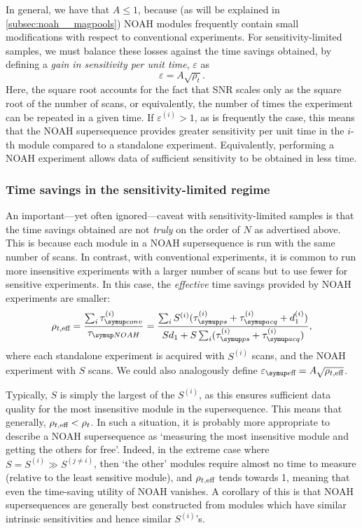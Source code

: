 In general, we have that $A \leq 1$, because (as will be explained in \cref{subsec:noah__magpools}) NOAH modules frequently contain small modifications with respect to conventional experiments.
For sensitivity-limited samples, we must balance these losses against the time savings obtained, by defining a \textit{gain in sensitivity per unit time}, $\varepsilon$ as
\begin{equation}
    \label{eq:varepsilon_i}
    \varepsilon = A \sqrt{\rho_t}.
\end{equation}
Here, the square root accounts for the fact that SNR scales only as the square root of the number of scans, or equivalently, the number of times the experiment can be repeated in a given time.
If $\varepsilon^{(i)} > 1$, as is frequently the case, this means that the NOAH supersequence provides greater sensitivity per unit time in the $i$-th module compared to a standalone experiment.
Equivalently, performing a NOAH experiment allows data of sufficient sensitivity to be obtained in less time.


\subsubsection{Time savings in the sensitivity-limited regime}

An important---yet often ignored---caveat with sensitivity-limited samples is that the time savings obtained are not \textit{truly} on the order of $N$ as advertised above.
This is because each module in a NOAH supersequence is run with the same number of scans.
In contrast, with conventional experiments, it is common to run more insensitive experiments with a larger number of scans but to use fewer for sensitive experiments.
In this case, the \textit{effective} time savings provided by NOAH experiments are smaller:
\begin{equation}
    \label{eq:rho_t_eff}
    \rhoteff
    = \frac{\sum_i \tauconv^{(i)}}{\tauNOAH}
    = \frac{{\sum_i S^{(i)}(\taups^{(i)} + \tauacq^{(i)} + d_1^{(i)})}}{Sd_1 + S\sum_i (\taups^{(i)} + \tauacq^{(i)})},
\end{equation}
where each standalone experiment is acquired with $S^{(i)}$ scans, and the NOAH experiment with $S$ scans.
We could also analogously define $\vareeff = A\sqrt{\rhoteff}$.

Typically, $S$ is simply the largest of the $S^{(i)}$, as this ensures sufficient data quality for the most insensitive module in the supersequence.
This means that generally, $\rho_{t,\text{eff}} < \rho_t$.
In such a situation, it is probably more appropriate to describe a NOAH supersequence as `measuring the most insensitive module and getting the others for free'.
Indeed, in the extreme case where $S = S^{(i)} \gg S^{(j\neq i)}$, then `the other' modules require almost no time to measure (relative to the least sensitive module), and $\rho_{t,\text{eff}}$ tends towards 1, meaning that even the time-saving utility of NOAH vanishes.
A corollary of this is that NOAH supersequences are generally best constructed from modules which have similar intrinsic sensitivities and hence similar $S^{(i)}$'s.

